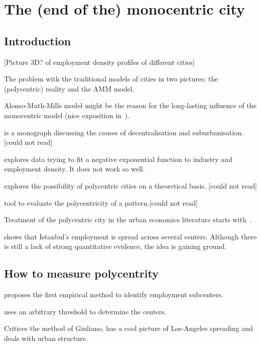 %
\chapter{The (end of the) monocentric city}
\label{sec:related}


\section{Introduction}
\label{sec:introduction}

[Picture 3D? of employment density profiles of different cities]

The problem with the traditional models of cities in two pictures: the
(polycentric) reality and the AMM model.


Alonso-Muth-Mills model might be the reason for the long-lasting influence of
the monocentric model (nice exposition in~\cite{Fujita:1989}).

\cite{Mills:1972} is a monograph discussing the causes of decentralisation and
suburbanisation. [could not read]

\cite{Kemper:1974} explores data trying to fit a negative exponential function
to industry and employment density. It does not work so well.

\cite{Odland:1978} explores the possibility of polycentric cities on a
theoretical basis. [could not read]

\cite{Griffith:1981} tool to evaluate the polycentricity of a pattern.[could not
read]

Treatment of the polycentric city in the urban economics literature starts
with~\cite{Fujita:1982}.

\cite{Dokmeci:1994} shows that Istanbul's employment is spread across several
centers. Although there is still a lack of strong quantitative evidence, the
idea is gaining ground.



\section{How to measure polycentrity}
\label{sec:how_to_measure_polycentrity}

\cite{McDonald:1987} proposes the first empirical method to identify employment
subcenters.

\cite{Giuliano:1991} uses an arbitrary threshold to determine the centers.

\cite{Anas:1998} Critices the method of Giuliano, has a cool picture of
Los-Angeles spreading and deals with urban structure.

